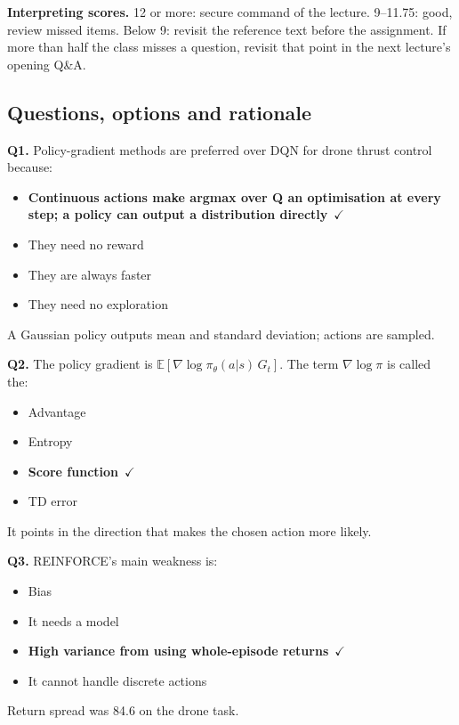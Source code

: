 \documentclass[11pt]{article}
\begin{document}
\textbf{Interpreting scores.} 12 or more: secure command of the lecture. 9--11.75: good, review missed items. Below 9: revisit the reference text before the assignment. If more than half the class misses a question, revisit that point in the next lecture's opening Q\&A.

\subsection*{Questions, options and rationale}

{\small

\noindent\textbf{Q1.} Policy-gradient methods are preferred over DQN for drone thrust control because:\begin{itemize}[leftmargin=2.2em,itemsep=0pt,topsep=1pt]\item[\textbf{A.}] \textbf{Continuous actions make argmax over Q an optimisation at every step; a policy can output a distribution directly}~{\color{GrnN}$\checkmark$}\item[B.] They need no reward\item[C.] They are always faster\item[D.] They need no exploration\end{itemize} A Gaussian policy outputs mean and standard deviation; actions are sampled.\par\medskip

\noindent\textbf{Q2.} The policy gradient is $\mathbb E[\nabla\log\pi_\theta(a|s)\,G_t]$. The term $\nabla\log\pi$ is called the:\begin{itemize}[leftmargin=2.2em,itemsep=0pt,topsep=1pt]\item[A.] Advantage\item[B.] Entropy\item[\textbf{C.}] \textbf{Score function}~{\color{GrnN}$\checkmark$}\item[D.] TD error\end{itemize} It points in the direction that makes the chosen action more likely.\par\medskip

\noindent\textbf{Q3.} REINFORCE's main weakness is:\begin{itemize}[leftmargin=2.2em,itemsep=0pt,topsep=1pt]\item[A.] Bias\item[B.] It needs a model\item[\textbf{C.}] \textbf{High variance from using whole-episode returns}~{\color{GrnN}$\checkmark$}\item[D.] It cannot handle discrete actions\end{itemize} Return spread was 84.6 on the drone task.\par\medskip

}
\end{document}
